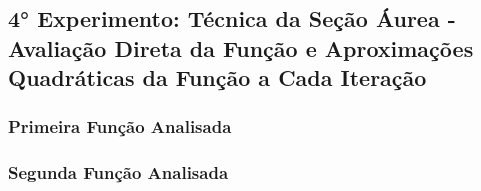 \subsection{4° Experimento: Técnica da Seção Áurea - Avaliação Direta da Função e Aproximações Quadráticas da Função a Cada Iteração}
    \subsubsection{Primeira Função Analisada}
    \subsubsection{Segunda Função Analisada}